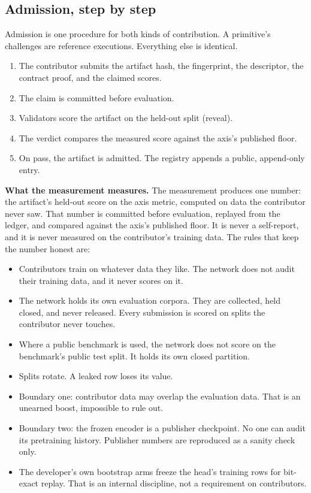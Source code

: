 \documentclass[11pt]{article}
\begin{document}
\subsection{Admission, step by step}

Admission is one procedure for both kinds of contribution. A
primitive's challenges are reference executions. Everything else
is identical.

\begin{enumerate}
    \item The contributor submits the artifact hash, the fingerprint,
          the descriptor, the contract proof, and the claimed scores.
    \item The claim is committed before evaluation.
    \item Validators score the artifact on the held-out split
          (reveal).
    \item The verdict compares the measured score against the axis's
          published floor.
    \item On pass, the artifact is admitted. The registry appends a
          public, append-only entry.
\end{enumerate}

\textbf{What the measurement measures.} The measurement produces
one number: the artifact's held-out score on the axis metric,
computed on data the contributor never saw. That number is committed
before evaluation, replayed from the ledger, and compared against
the axis's published floor. It is never a self-report, and it is
never measured on the contributor's training data. The rules that
keep the number honest are:
\begin{itemize}
    \item Contributors train on whatever data they like. The network
          does not audit their training data, and it never scores on it.
    \item The network holds its own evaluation corpora. They are
          collected, held closed, and never released. Every submission is
          scored on splits the contributor never touches.
    \item Where a public benchmark is used, the network does not
          score on the benchmark's public test split. It holds its own
          closed partition.
    \item Splits rotate. A leaked row loses its value.
    \item Boundary one: contributor data may overlap the evaluation
          data. That is an unearned boost, impossible to rule out.
    \item Boundary two: the frozen encoder is a publisher checkpoint.
          No one can audit its pretraining history. Publisher numbers are
          reproduced as a sanity check only.
    \item The developer's own bootstrap arms freeze the head's training
          rows for bit-exact replay. That is an internal discipline, not a
          requirement on contributors.
\end{itemize}
\end{document}
